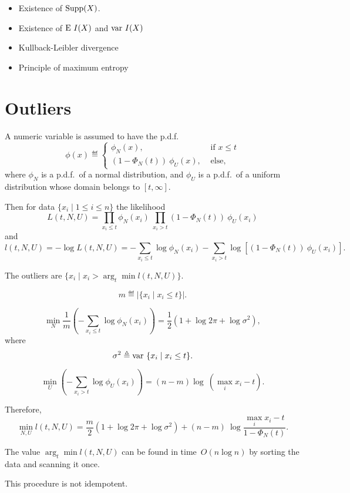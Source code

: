 \documentclass[10pt,a4paper]{article}
\theoremstyle{plain} \newtheorem{Lem}{Lemma}
\begin{document}
\Questions
\begin{itemize}
  \item Existence of $\mathrm {Supp}(X)$.
  \item Existence of $\mathrm E \  I(X)$ and $\mathrm {var} \  I(X)$ 
  \item Kullback-Leibler divergence
  \item Principle of maximum entropy
\end{itemize}


\section{Outliers}

A numeric variable is assumed to have the p.d.f.
\begin{equation*}
  \phi(x) \eqdef 
    \begin{cases}
       \phi_N(x), &\text{ if } x \le t\\
       (1 - \Phi_N(t)) \ \phi_U(x),   &\text{ else,}
     \end{cases}
\end{equation*}
where $\phi_N$ is a p.d.f.~of a normal distribution,
and $\phi_U$ is a p.d.f.~of a uniform distribution whose domain belongs to $[t,\infty]$.

Then for data $\{x_i \mid 1 \le i \le n\}$ 
the likelihood
$$ L(t,N,U) = \prod_{x_i \le t} \phi_N(x_i) \ \prod_{x_i > t} (1 - \Phi_N(t)) \ \phi_U(x_i) $$
and 
$$ l(t,N,U) = - \log L(t,N,U) = -\sum_{x_i \le t} \log \phi_N(x_i) - \sum_{x_i > t} \log [(1 - \Phi_N(t)) \ \phi_U(x_i)]. $$

The outliers are $\{x_i \mid x_i > \arg_t \min l(t,N,U)\}$.

$$ m \eqdef |\{x_i \mid x_i \le t\}|. $$

$$ \min_N \frac 1 m \left(- \sum_{x_i \le t} \log \phi_N(x_i) \right) = \frac 1 2 \left(1 + \log 2 \pi + \log \sigma^2 \right), $$
where
$$ \sigma^2 \triangleq \mathrm {var} \  \{x_i \mid x_i \le t\}. $$

$$ \min_U \left(- \sum_{x_i > t} \log \phi_U(x_i) \right) = (n - m) \log \ (\max_i x_i - t). $$

Therefore,
$$ \min_{N,U} l(t,N,U) = \frac m 2 \left(1 + \log 2 \pi + \log \sigma^2 \right) + (n - m) \ \log \frac {\max_i x_i - t} {1 - \Phi_N(t)}. $$

The value $\arg_t \min l(t,N,U)$ can be found in time~$O(n \log n)$ by sorting the data and scanning it once.

This procedure is not idempotent.
\end{document}
